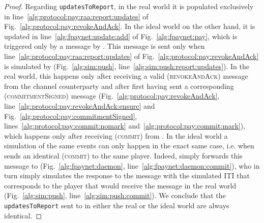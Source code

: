 \begin{proof}
  Regarding \texttt{updatesToReport}, in the real world it is populated
  exclusively in line~\ref{alg:protocol:pay:raa:report:updates} of
  Fig.~\ref{alg:protocol:pay:revokeAndAck}. In the ideal world on the other
  hand, it is updated in line~\ref{alg:fpaynet:update:add} of
  Fig.~\ref{alg:fpaynet:pay}, which is triggered only by a
  message by \simulator. This message is sent only when
  line~\ref{alg:protocol:pay:raa:report:updates} of
  Fig.~\ref{alg:protocol:pay:revokeAndAck} is simulated by \simulator{}
  (Fig.~\ref{alg:sim:push}, line~\ref{alg:sim:push:report:updates}). In the real
  world, this happens only after receiving a valid (\textsc{revokeAndAck})
  message from the channel counterparty and after first having sent a
  corresponding (\textsc{commitmentSigned}) message
  (Fig.~\ref{alg:protocol:pay:revokeAndAck},
  line~\ref{alg:protocol:pay:revokeAndAck:ensure} and
  Fig.~\ref{alg:protocol:pay:commitmentSigned},
  lines~\ref{alg:protocol:pay:commit:nomark}
  and~\ref{alg:protocol:pay:commit:mark}), which happens only after receiving
  (\textsc{commit}) from \environment. In the ideal world a simulation of the
  same events can only happen in the exact same case, i.e. when \environment{}
  sends an identical (\textsc{commit}) to the same player. Indeed, \fpaynet{}
  simply forwards this message to \simulator{} (Fig.~\ref{alg:fpaynet:daemon},
  line~\ref{alg:fpaynet:daemon:commit}), who in turn simply simulates the
  response to the message with the simulated ITI that corresponds to the player
  that would receive the message in the real world (Fig.~\ref{alg:sim:push},
  line~\ref{alg:sim:push:commit}). We conclude that the \texttt{updatesToReport}
  sent to \environment{} in either the real or the ideal world are always
  identical.


\end{proof}
